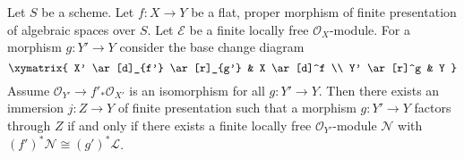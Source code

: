 \begin{lemma}
\label{lemma-diagonal-picard-flat-proper}
Let $S$ be a scheme.
Let $f : X \to Y$ be a flat, proper morphism of finite presentation
of algebraic spaces over $S$.
Let $\mathcal{E}$ be a finite locally free $\mathcal{O}_X$-module.
For a morphism $g : Y' \to Y$ consider the base change diagram
$$
\xymatrix{
X' \ar[d]_{f'} \ar[r]_{g'} & X \ar[d]^f \\
Y' \ar[r]^g & Y
}
$$
Assume $\mathcal{O}_{Y'} \to f'_*\mathcal{O}_{X'}$ is an
isomorphism for all $g : Y' \to Y$.
Then there exists an immersion $j : Z \to Y$ of finite presentation
such that a morphism $g : Y' \to Y$ factors through $Z$ if and only if
there exists a finite locally free $\mathcal{O}_{Y'}$-module $\mathcal{N}$
with $(f')^*\mathcal{N} \cong (g')^*\mathcal{L}$.
\end{lemma}

